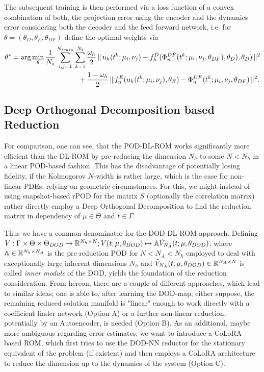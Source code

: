 The subsequent training is then performed via a loss function of a convex combination of both, the projection error using the encoder and the dynamics error considering both the decoder and the feed forward network, i.e. for $\theta = (\theta_D, \theta_E, \theta_{DF})$ define the optimal weights via
\begin{align}
    \theta^* = \operatorname{arg}\min_\theta \frac{1}{N_s} \sum_{i, j = 1}^{N_{train}} \sum_{k = 1}^{N_t} \, &\frac{\omega_h}{2} \, \lVert \, u_h(t^k; \mu_i, \nu_j) - f^D_h(\Phi_n^{DF}(t^k; \mu_i, \nu_j, \theta_{DF}), \theta_D), \theta_{D}) \, \rVert^2 \\
    + \, &\frac{1 - \omega_h}{2} \, \lVert \, f^E_n(u_h(t^k; \mu_i, \nu_j), \theta_E) - \Phi_n^{DF}(t^k; \mu_i, \nu_j, \theta_{DF}) \, \rVert^2.
\end{align}

\subsection{Deep Orthogonal Decomposition based Reduction}


For comparison, one can see, that the POD-DL-ROM works significantly more efficient than the DL-ROM by pre-reducing the dimension $N_h$ to some $N < N_h$ in a linear POD-based fashion. This has the disadvantage of potentially losing fidelity, if the Kolmogorov $N$-width is rather large, which is the case for non-linear PDEs, relying on geometric circumstances. For this, we might instead of using snapshot-based rPOD for the matrix $S$ (optionally the correlation matrix) rather directly employ a Deep Orthogonal Decomposition to find the reduction matrix in dependency of $\mu \in \Theta$ and $t \in \Gamma$.

Thus we have a common denominator for the DOD-DL-ROM approach. Defining $V: \Gamma \times \Theta \times \Theta_{DOD} \to \mathbb{R}^{N_h \times N}; V(t; \mu, \theta_{DOD}) \mapsto \mathbb{A} \Tilde{V}_{N_A}(t; \mu, \theta_{DOD})$, where $\mathbb{A} \in \mathbb{R}^{N_h \times N_A}$ is the pre-reduction POD for $N < N_A < N_h$ employed to deal with exceptionally large inherent dimensions $N_h$ and $\Tilde{V}_{N_A}(t; \mu, \theta_{DOD}) \in \mathbb{R}^{N_A \times N}$ is called \emph{inner module} of the DOD, yields the foundation of the reduction consideration. From hereon, there are a couple of different approaches, which lead to similar ideas; one is able to, after learning the DOD-map, either suppose, the remaining reduced solution manifold is "linear" enough to work directly with a coefficient finder network (Option A) or a further non-linear reduction, potentially by an Autoencoder, is needed (Option B). As an additional, maybe more ambiguous regarding error estimates, we want to introduce a CoLoRA-based ROM, which first tries to use the DOD-NN reductor for the stationary equivalent of the problem (if existent) and then employs a CoLoRA architecture to reduce the dimension up to the dynamics of the system (Option C). 

